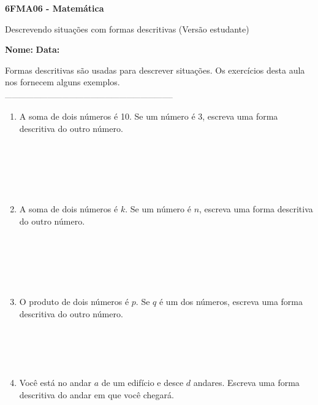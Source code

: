 \documentclass[a4paper,14pt]{article}
\begin{document}
	
	\noindent\textbf{6FMA06 - Matemática} 
	
	\begin{center}Descrevendo situações com formas descritivas (Versão estudante)
	\end{center}
	
	\noindent\textbf{Nome:} \underline{\hspace{10cm}}
	\noindent\textbf{Data:} \underline{\hspace{4cm}}
	
	
	\begin{multicols}{2}
		\noindent Formas descritivas são usadas para descrever situações. Os exercícios desta aula nos fornecem alguns exemplos. \\
		\noindent\textsubscript{-----------------------------------------------------------------------}
		\begin{enumerate}
			\item A soma de dois números é 10. Se um número é 3, escreva uma forma descritiva do outro número. \\\\\\\\\\\\
			\item A soma de dois números é $k$. Se um número é $n$, escreva uma forma descritiva do outro número. \\\\\\\\\\\\
			\item O produto de dois números é $p$. Se $q$ é um dos números, escreva uma forma descritiva do outro número. \\\\\\\\\\
			\item Você está no andar $a$ de um edifício e desce $d$ andares. Escreva uma forma descritiva do andar em que você chegará. \\\\\\\\\\\\\\\\\\\\

\end{enumerate}
\end{multicols}
\end{document}
